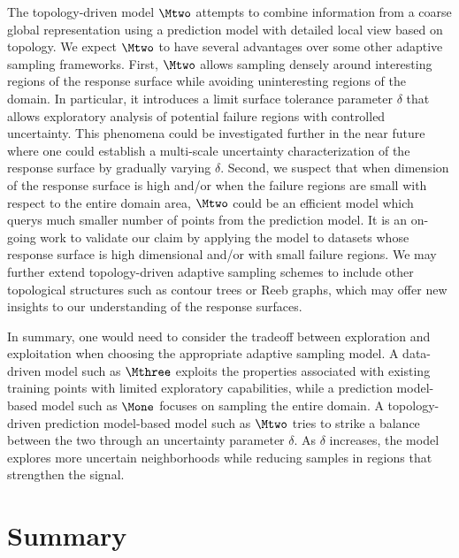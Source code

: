 The topology-driven model $\Mtwo$ attempts to combine information from a coarse global representation using a prediction model with detailed local view based on topology.
%
We expect $\Mtwo$ to have several advantages over some other adaptive sampling frameworks.
%
First, $\Mtwo$ allows sampling densely around interesting regions of the response surface while avoiding uninteresting regions of the domain.
%
In particular, it introduces a limit surface tolerance parameter $\delta$ that allows exploratory analysis of potential failure regions with controlled uncertainty.
%
This phenomena could be investigated further in the near future where one could establish a multi-scale uncertainty characterization of the response surface by gradually varying $\delta$.
%
Second, we suspect that when dimension of the response surface is high and/or when the failure regions are small with respect to the entire domain area, $\Mtwo$ could be an efficient model which querys much smaller number of points from the prediction model.
%
It is an on-going work to validate our claim by applying the model to datasets whose response surface is high dimensional and/or with small failure regions.
%
We may further extend topology-driven adaptive sampling schemes to include other topological structures such as contour trees or Reeb graphs, which may offer new insights to our understanding of the response surfaces.

In summary, one would need to consider the tradeoff between exploration and exploitation when choosing the appropriate adaptive sampling model.
%
A data-driven model such as $\Mthree$ exploits the properties associated with existing training points with limited exploratory capabilities, while a prediction model-based model such as $\Mone$ focuses on sampling the entire domain.
%
A topology-driven prediction model-based model such as $\Mtwo$ tries to strike a balance between the two through an uncertainty parameter $\delta$.
%
As $\delta$ increases, the model explores more uncertain neighborhoods while reducing samples in regions that strengthen the signal.


\section{Summary}

% 